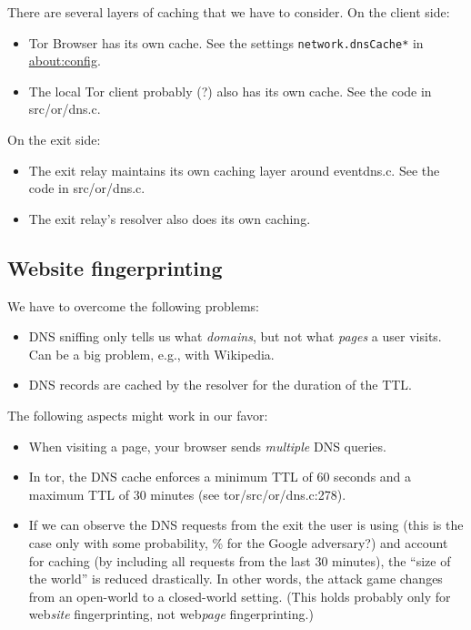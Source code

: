 There are several layers of caching that we have to consider.  On the client
side:
\begin{itemize}
	\item Tor Browser has its own cache.  See the settings
		\texttt{network.dnsCache*} in \url{about:config}.
	\item The local Tor client probably (?) also has its own cache.  See the
		code in src/or/dns.c.
\end{itemize}

On the exit side:
\begin{itemize}
	\item The exit relay maintains its own caching layer around eventdns.c.  See
		the code in src/or/dns.c.
	\item The exit relay's resolver also does its own caching.
\end{itemize}

\subsection{Website fingerprinting}
We have to overcome the following problems:
\begin{itemize}
	\item DNS sniffing only tells us what \emph{domains}, but not what
		\emph{pages} a user visits.  Can be a big problem, e.g., with Wikipedia.
	\item DNS records are cached by the resolver for the duration of the TTL.
\end{itemize}

The following aspects might work in our favor:
\begin{itemize}
	\item When visiting a page, your browser sends \emph{multiple} DNS queries.
	\item In tor, the DNS cache enforces a minimum TTL of 60 seconds and a maximum
	TTL of 30 minutes (see tor/src/or/dns.c:278).
	\item If we can observe the DNS requests from the exit the user is
	using (this is the case only with some probability, \% for
	the Google adversary?) and account for caching (by including all
	requests from the last 30 minutes), the ``size of the world'' is
	reduced drastically. In other words, the attack game changes from an
	open-world to a closed-world setting. (This holds probably only for
	web\emph{site} fingerprinting, not web\emph{page} fingerprinting.)
\end{itemize}

